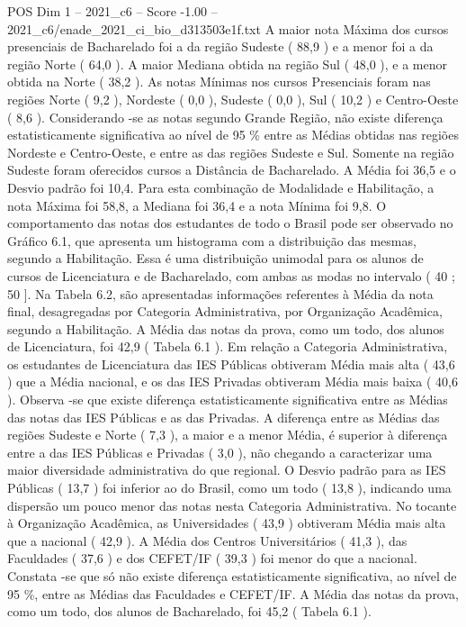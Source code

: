 \begin{textsample}{POS Dim 1 – 2021\_c6 – Score -1.00 – 2021\_c6/enade\_2021\_ci\_bio\_d313503e1f.txt}
A maior nota Máxima dos cursos presenciais de Bacharelado foi a da região Sudeste ( 88,9 ) e a menor foi a da região Norte ( 64,0 ).
A maior Mediana obtida na região Sul ( 48,0 ), e a menor obtida na Norte ( 38,2 ).
As notas Mínimas nos cursos Presenciais foram nas regiões Norte ( 9,2 ), Nordeste ( 0,0 ), Sudeste ( 0,0 ), Sul ( 10,2 ) e Centro-Oeste ( 8,6 ).
Considerando -se as notas segundo Grande Região, não existe diferença estatisticamente significativa ao nível de 95 \% entre as Médias obtidas nas regiões Nordeste e Centro-Oeste, e entre as das regiões Sudeste e Sul.
Somente na região Sudeste foram oferecidos cursos a Distância de Bacharelado.
A Média foi 36,5 e o Desvio padrão foi 10,4.
Para esta combinação de Modalidade e Habilitação, a nota Máxima foi 58,8, a Mediana foi 36,4 e a nota Mínima foi 9,8.
O comportamento das notas dos estudantes de todo o Brasil pode ser observado no Gráfico 6.1, que apresenta um histograma com a distribuição das mesmas, segundo a Habilitação.
Essa é uma distribuição unimodal para os alunos de cursos de Licenciatura e de Bacharelado, com ambas as modas no intervalo ( 40 ; 50 ].
Na Tabela 6.2, são apresentadas informações referentes à Média da nota final, desagregadas por Categoria Administrativa, por Organização Acadêmica, segundo a Habilitação.
A Média das notas da prova, como um todo, dos alunos de Licenciatura, foi 42,9 ( Tabela 6.1 ).
Em relação a Categoria Administrativa, os estudantes de Licenciatura das IES Públicas obtiveram Média mais alta ( 43,6 ) que a Média nacional, e os das IES Privadas obtiveram Média mais baixa ( 40,6 ).
Observa -se que existe diferença estatisticamente significativa entre as Médias das notas das IES Públicas e as das Privadas.
A diferença entre as Médias das regiões Sudeste e Norte ( 7,3 ), a maior e a menor Média, é superior à diferença entre a das IES Públicas e Privadas ( 3,0 ), não chegando a caracterizar uma maior diversidade administrativa do que regional.
O Desvio padrão para as IES Públicas ( 13,7 ) foi inferior ao do Brasil, como um todo ( 13,8 ), indicando uma dispersão um pouco menor das notas nesta Categoria Administrativa.
No tocante à Organização Acadêmica, as Universidades ( 43,9 ) obtiveram Média mais alta que a nacional ( 42,9 ).
A Média dos Centros Universitários ( 41,3 ), das Faculdades ( 37,6 ) e dos CEFET/IF ( 39,3 ) foi menor do que a nacional.
Constata -se que só não existe diferença estatisticamente significativa, ao nível de 95 \%, entre as Médias das Faculdades e CEFET/IF.
A Média das notas da prova, como um todo, dos alunos de Bacharelado, foi 45,2 ( Tabela 6.1 ).

\end{textsample}

